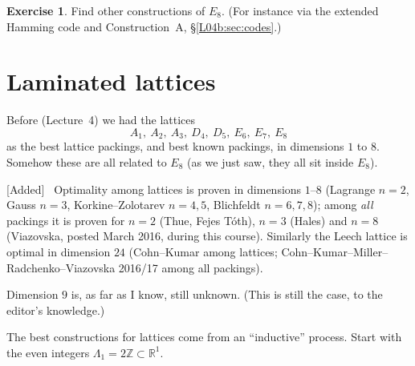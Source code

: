 \documentclass[11pt,openany]{book}
\theoremstyle{plain}
\theoremstyle{definition}
\newtheorem{exercise}[theorem]{Exercise}
\theoremstyle{remark}
\newcommand{\added}[1]{{\color{addcol}#1}}
\newenvironment{addedblock}{\par\color{addcol}\noindent\textsf{\small[Added]}\ }{\par}
\newcommand{\R}{\mathbb{R}}
\newcommand{\Z}{\mathbb{Z}}
\begin{document}
\begin{exercise}
Find other constructions of $E_8$. \added{(For instance via the extended Hamming code and
Construction~A, \S\ref{L04b:sec:codes}.)}
\end{exercise}

\section{Laminated lattices}
\label{L04b:sec:laminated}

Before (Lecture~4) we had the lattices
\[
  A_1,\ A_2,\ A_3,\ D_4,\ D_5,\ E_6,\ E_7,\ E_8
\]
as the best lattice packings, and best known packings, in dimensions $1$ to $8$. Somehow these
are all related to $E_8$ (as we just saw, they all sit inside $E_8$).

\begin{addedblock}
Optimality among lattices is proven in dimensions $1$--$8$ (Lagrange $n=2$, Gauss $n=3$,
Korkine--Zolotarev $n=4,5$, Blichfeldt $n=6,7,8$); among \emph{all} packings it is proven for
$n=2$ (Thue, Fejes T\'oth), $n=3$ (Hales) and $n=8$ (Viazovska, posted March 2016, during this course).
Similarly the Leech lattice is optimal in dimension $24$ (Cohn--Kumar among lattices;
Cohn--Kumar--Miller--Radchenko--Viazovska 2016/17 among all packings).
\end{addedblock}

Dimension $9$ is, as far as I know, still unknown.
\added{(This is still the case, to the editor's knowledge.)}

The best constructions for lattices come from an ``inductive'' process. Start with the even
integers $\Lambda_1 = 2\Z\subset\R^1$.
\end{document}
